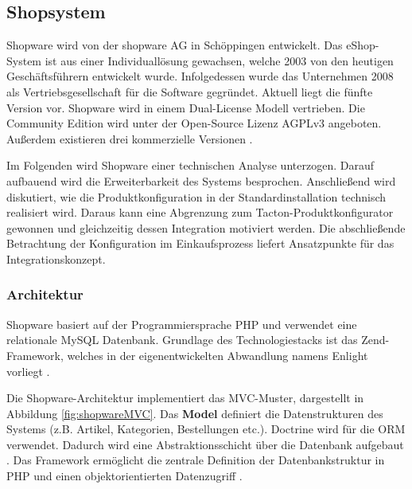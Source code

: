 \documentclass[11pt, a4paper, titlepage, listof=totoc, bibliography=totoc, index=totoc, twoside, openright, headings=normal]{scrreprt}
\begin{document}
\subsection{Shopsystem}
\label{subsection:Shopsystem}

Shopware wird von der shopware AG in Schöppingen entwickelt. Das eShop-System ist aus einer Individuallösung gewachsen, welche 2003 von den heutigen Geschäftsführern entwickelt wurde. Infolgedessen wurde das Unternehmen 2008 als Vertriebsgesellschaft für die Software gegründet. Aktuell liegt die fünfte Version vor. Shopware wird in einem Dual-License Modell vertrieben. Die Community Edition wird unter der \citeauthor{gnuAGPLv3} Open-Source Lizenz \glqq AGPLv3\grqq{} angeboten. Außerdem existieren drei kommerzielle Versionen \citep{shopwareUnternehmen}.

Im Folgenden wird Shopware einer technischen Analyse unterzogen. Darauf aufbauend wird die Erweiterbarkeit des Systems besprochen. Anschließend wird diskutiert, wie die Produktkonfiguration in der Standardinstallation technisch realisiert wird. Daraus kann eine Abgrenzung zum Tacton-Produktkonfigurator gewonnen und gleichzeitig dessen Integration motiviert werden. Die abschließende Betrachtung der Konfiguration im Einkaufsprozess liefert Ansatzpunkte für das Integrationskonzept.

\subsubsection{Architektur}
\label{subsubsection:shopwareArchitektur}
Shopware basiert auf der Programmiersprache PHP und verwendet eine relationale MySQL Datenbank. Grundlage des Technologiestacks ist das Zend-Framework, welches in der eigenentwickelten Abwandlung namens Enlight vorliegt \citep{shopware5Docs}.

Die Shopware-Architektur implementiert das \ac{MVC}-Muster, dargestellt in Abbildung \ref{fig:shopwareMVC}. Das \textbf{Model} definiert die Datenstrukturen des Systems (z.B. Artikel, Kategorien, Bestellungen etc.). Doctrine wird für die \ac{ORM} verwendet. Dadurch wird eine Abstraktionsschicht über die Datenbank aufgebaut \citep{shopware5Docs}. Das Framework ermöglicht die zentrale Definition der Datenbankstruktur in PHP und einen objektorientierten Datenzugriff \citep{shopware4Docs}.
\end{document}
